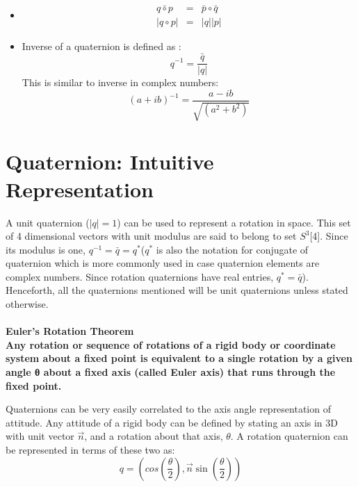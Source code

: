 \documentclass{article}
\begin{document}
\begin{itemize}
		\item \begin{eqnarray}
		\bar{q\circ p} &=& \bar{p}\circ \bar{q}\\
		|q \circ p| &=& |q||p|
		\end{eqnarray}
		
		\item Inverse of a quaternion is defined as :
		\begin{equation}
		q^{-1} = \frac{\bar{q}}{|q|}
		\end{equation}
		This is similar to inverse in complex numbers:
		\begin{equation}
		(a+ib)^{-1} = \frac{a-ib}{\sqrt{(a^2+b^2)}}
		\end{equation} 
		
	\end{itemize}
	
	\section{Quaternion: Intuitive Representation}
	
	A unit quaternion ($|q|=1$) can be used to represent a rotation in space. This set of 4 dimensional vectors with unit modulus are said to belong to set $S^3$[4]. Since its modulus is one, $q^{-1}=\bar{q}=q^*$($q^*$ is also the notation for conjugate of quaternion which is more commonly used in case quaternion elements are complex numbers. Since rotation quaternions have real entries, $q^*=\bar{q}$). Henceforth, all the quaternions mentioned will be unit quaternions unless stated otherwise. \\ \\	
		\textbf{Euler's Rotation Theorem}\\
		\textbf{Any rotation or sequence of rotations of a rigid body or coordinate system about a fixed point is equivalent to a single rotation by a given angle θ about a fixed axis (called Euler axis) that runs through the fixed point.}
		
		Quaternions can be very easily correlated to the axis angle representation of attitude. Any attitude of a rigid body can be defined by stating an axis in 3D with unit vector $\vec{n}$, and a rotation about that axis, $\theta$. A rotation quaternion can be represented in terms of these two as:
		\begin{equation}
			q =  \left(cos\left(\frac{\theta}{2}\right),\vec{n}\sin\left(\frac{\theta}{2}\right)\right)
		\end{equation}
		
\end{document}
